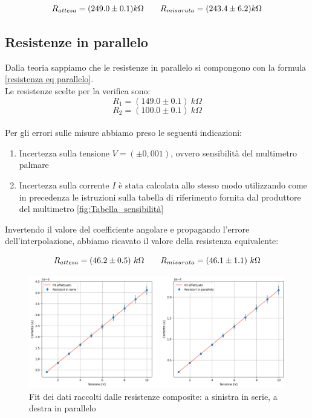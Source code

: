 \documentclass[letterpaper,12pt]{article}
\begin{document}
\begin{equation}
     R_{attesa}= (249.0 \pm0.1) k\Omega \qquad  R_{ misurata} = (243.4 \pm 6.2) k\Omega
    \label{resistenza serie}
    \notag
\end{equation}

\subsection{Resistenze in parallelo}
Dalla teoria sappiamo che le resistenze in parallelo si compongono con la formula \eqref{resistenza eq parallelo}.\\
Le resistenze scelte per la verifica sono: $$R_1 = (149.0\pm0.1)\ k\Omega$$
$$R_2 = (100.0\pm0.1)\  k\Omega$$\\
Per gli errori sulle misure abbiamo preso le seguenti indicazioni: 
\begin{enumerate}
\item Incertezza sulla tensione $V=(\pm0,001)$, ovvero sensibilità del multimetro palmare
\item Incertezza sulla corrente $I$ è stata calcolata allo stesso modo utilizzando come in precedenza le istruzioni sulla tabella di riferimento fornita dal produttore del multimetro \ref{fig:Tabella_sensibilità}
\end{enumerate}
Invertendo il valore del coefficiente angolare e propagando l'errore dell'interpolazione, abbiamo ricavato il valore della resistenza equivalente:

\begin{equation}
     R_{attesa}= (46.2 \pm0.5)\ k\Omega \qquad  R_{ misurata} = (46.1 \pm 1.1)\ k\Omega
    \label{resistenza parallelo}
    \notag
\end{equation}

\begin{figure}[htbp]
    \centering
    \includegraphics[width=.65\textwidth]{fit_resistenze_composite.png}
    \caption{Fit dei dati raccolti dalle resistenze composite: a sinistra in serie, a destra in parallelo}
    \label{fig:Fit resistenze composite}
\end{figure}
\end{document}
